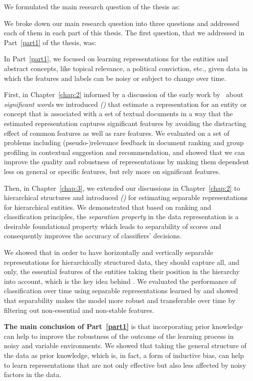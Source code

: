 We formulated the main research question of the thesis as:
%
%

We broke down our main research question into three questions and addressed each of them in each part of this thesis.
The first question, that we addressed in Part~\ref{part1} of the thesis, was:
%

In Part~\ref{part1}, we focused on learning representations for the entities and abstract concepts, like topical relevance, a political conviction, etc., given data in which the features and labels can be noisy or subject to change over time.

First, in Chapter~\ref{chap:2} informed by a discussion of the early work by~\citet{Luhn:1958} about \emph{significant words} we introduced \emph{\SWLMs (\acswlms)} that estimate a representation for an entity or concept that is associated with a set of textual documents in a way that the estimated representation captures significant features by avoiding the distracting effect of common features as well as rare features. We evaluated \acswlms on a set of problems including (pseudo-)relevance feedback in document ranking and group profiling in contextual suggestion and recommendation, and showed that we can improve the quality and robustness of representations by making them dependent less on general or specific features, but rely more on significant features.

Then, in Chapter~\ref{chap:3}, we extended our discussions in Chapter~\ref{chap:2} to hierarchical structures and introduced \emph{\HSWLMs (\achswlms)} for estimating separable representations for hierarchical entities. We demonstrated that based on ranking and classification principles, the \emph{separation property} in the data representation is a desirable foundational property which leads to separability of scores and consequently improves the accuracy of classifiers' decisions. 

We showed that in order to have horizontally and vertically separable representations for hierarchically structured data, they should capture all, and only, the essential features of the entities taking their position in the hierarchy into account, which is the key idea behind \achswlms. We evaluated the performance of classification over time using separable representations learned by \achswlms and showed that separability makes the model more robust and transferable over time by filtering out non-essential and non-stable features.

\textbf{The main conclusion of Part~\ref{part1}} is that incorporating prior knowledge can help to improve the robustness of the outcome of the learning process in noisy and variable environments. We showed that taking the general structure of the data as prior knowledge, which is, in fact, a form of inductive bias, can help to learn representations that are not only effective but also less affected by noisy factors in the data.

